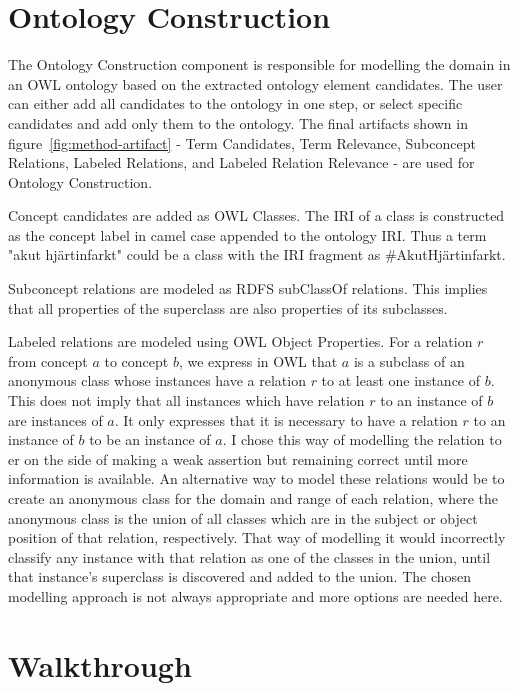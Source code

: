 \documentclass[a4paper]{report}
\begin{document}
\section{Ontology Construction}
\label{sec:results:proto:contruction}

The Ontology Construction component is responsible for modelling the domain in an OWL ontology based on the extracted ontology element candidates.
The user can either add all candidates to the ontology in one step, or select specific candidates and add only them to the ontology.
The final artifacts shown in figure~\ref{fig:method-artifact} - Term Candidates, Term Relevance, Subconcept Relations, Labeled Relations, and Labeled Relation Relevance - are used for Ontology Construction.

Concept candidates are added as OWL Classes.
The IRI of a class is constructed as the concept label in camel case appended to the ontology IRI.
Thus a term "akut hjärtinfarkt" could be a class with the IRI fragment as \#AkutHjärtinfarkt.

Subconcept relations are modeled as RDFS subClassOf relations.
This implies that all properties of the superclass are also properties of its subclasses.

Labeled relations are modeled using OWL Object Properties.
For a relation \(r\) from concept \(a\) to concept \(b\), we express in OWL that \(a\) is a subclass of an anonymous class whose instances have a relation \(r\) to at least one instance of \(b\).
This does not imply that all instances which have relation \(r\) to an instance of \(b\) are instances of \(a\).
It only expresses that it is necessary to have a relation \(r\) to an instance of \(b\) to be an instance of \(a\).
I chose this way of modelling the relation to er on the side of making a weak assertion but remaining correct until more information is available.
An alternative way to model these relations would be to create an anonymous class for the domain and range of each relation, where the anonymous class is the union of all classes which are in the subject or object position of that relation, respectively.
That way of modelling it would incorrectly classify any instance with that relation as one of the classes in the union, until that instance's superclass is discovered and added to the union.
The chosen modelling approach is not always appropriate and more options are needed here.

\section{Walkthrough}
\label{sec:results:walkthrough}
\end{document}
